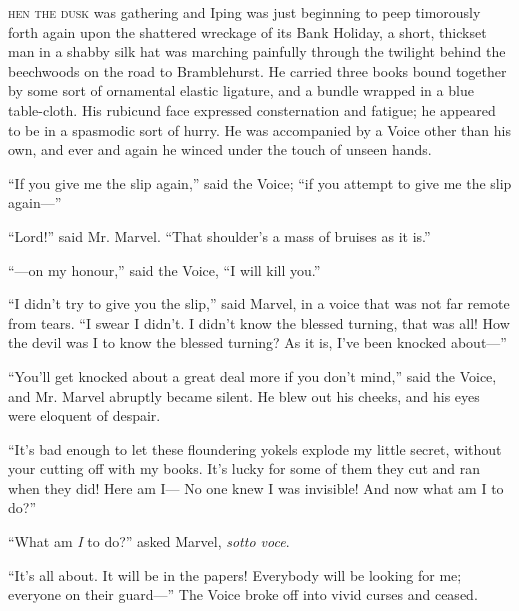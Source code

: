 \label{ch:13}
\begin{ChapterStart}
\vspace*{2\nbs}

\vspace{1.5\nbs}
\vspace{0.75\nbs}
\end{ChapterStart}

\kern-4pt\textsc{hen the dusk} was gathering and Iping was just beginning to peep timorously forth again upon the shattered wreckage of its Bank Holiday, a short, thickset man in a shabby silk hat was marching painfully through the twilight behind the beechwoods on the road to Bramblehurst. He carried three books bound together by some sort of ornamental elastic ligature, and a bundle wrapped in a blue table-cloth. His rubicund face expressed consternation and fatigue; he appeared to be in a spasmodic sort of hurry. He was accompanied by a Voice other than his own, and ever and again he winced under the touch of unseen hands.

“If you give me the slip again,” said the Voice; “if you attempt to give me the slip again—”

“Lord!” said Mr. Marvel. “That shoulder’s a mass of bruises as it is.”

“—on my honour,” said the Voice, “I will kill you.”

“I didn’t try to give you the slip,” said Marvel, in a voice that was not far remote from tears. “I swear I didn’t. I didn’t know the blessed turning, that was all! How the devil was I to know the blessed turning? As it is, I’ve been knocked about—”

“You’ll get knocked about a great deal more if you don’t mind,” said the Voice, and Mr. Marvel abruptly became silent. He blew out his cheeks, and his eyes were eloquent of despair.

“It’s bad enough to let these floundering yokels explode my little secret, without your cutting off with my books. It’s lucky for some of them they cut and ran when they did! Here am I— No one knew I was invisible! And now what am I to do?”

“What am \emph{I} to do?” asked Marvel, \emph{sotto voce}.

“It’s all about. It will be in the papers! Everybody will be looking for me; everyone on their guard—” The Voice broke off into vivid curses and ceased.

